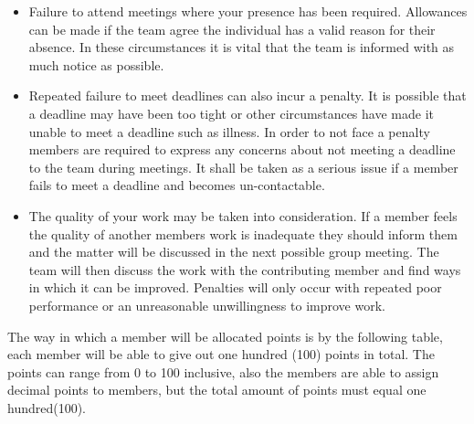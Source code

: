 \documentclass[oneside]{article}
\begin{document}
 \begin{itemize} 
\item Failure to attend meetings where your presence has been required. Allowances can be made if the team agree the individual has a valid reason for their absence. In these circumstances it is vital that the team is informed with as much notice as possible.

\item Repeated failure to meet deadlines can also incur a penalty. It is possible that a deadline may have been too tight or other circumstances have made it unable to meet a deadline such as illness. In order to not face a penalty members are required to express any concerns about not meeting a deadline to the team during meetings. It shall be taken as a serious issue if a member fails to meet a deadline and becomes un-contactable.

\item The quality of your work may be taken into consideration. If a member feels the quality of another members work is inadequate they should inform them and the matter will be discussed in the next possible group meeting. The team will then discuss the work with the contributing member and find ways in which it can be improved. Penalties will only occur with repeated poor performance or an unreasonable unwillingness to improve work. 
 \end{itemize}
\newpage

\noindent The way in which a member will be allocated points is by the following table, each member will be able to give out one hundred (100) points in total. The points can range from 0 to 100 inclusive, also the members are able to assign decimal points to members, but the total amount of points must equal one hundred(100).
	
\begin{table}[h]
\caption{Peer Assessment table}
\end{table}

%

\clearpage



\newpage
\end{document}

